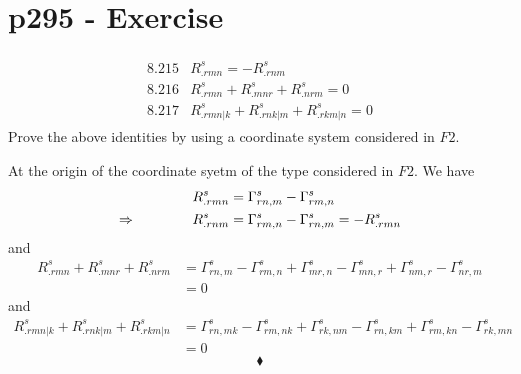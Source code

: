 \section{p295 - Exercise}
\begin{tcolorbox}
\begin{align*}
\begin{array}{ll}
\mathbf{8.215}& R^s_{.rmn} = -R^s_{.rnm}\\
\mathbf{8.216}& R^s_{.rmn} + R^s_{.mnr}+ R^s_{.nrm}=0\\
\mathbf{8.217}& R^s_{.rmn|k} + R^s_{.rnk|m}+ R^s_{.rkm|n}=0
\end{array}
\end{align*}
Prove the above identities by using a coordinate system considered in $F2$.
\end{tcolorbox}
 At the origin of the coordinate syetm of the type considered in $F2$. We have 
 \begin{align}
 R^s_{.rmn}&= \Gamma^s_{rn,m}-\Gamma^s_{rm,n}\\
 \Rightarrow \quad\quad\quad\quad R^s_{.rnm}&= \Gamma^s_{rm,n}-\Gamma^s_{rn,m} = -R^s_{.rmn}
 \end{align}
 and 
 \begin{align}
 R^s_{.rmn} + R^s_{.mnr}+ R^s_{.nrm}&= \Gamma^s_{rn,m}-\Gamma^s_{rm,n} +\Gamma^s_{mr,n}-\Gamma^s_{mn,r} +\Gamma^s_{nm,r}-\Gamma^s_{nr,m} \\
 &=0
 \end{align}
 and 
 \begin{align}
 R^s_{.rmn|k} + R^s_{.rnk|m}+ R^s_{.rkm|n}&= \Gamma^s_{rn,mk}-\Gamma^s_{rm,nk} +\Gamma^s_{rk,nm}-\Gamma^s_{rn,km} +\Gamma^s_{rm,kn}-\Gamma^s_{rk,mn}\\
 &=0
 \end{align}
$$\blacklozenge$$
\newpage

